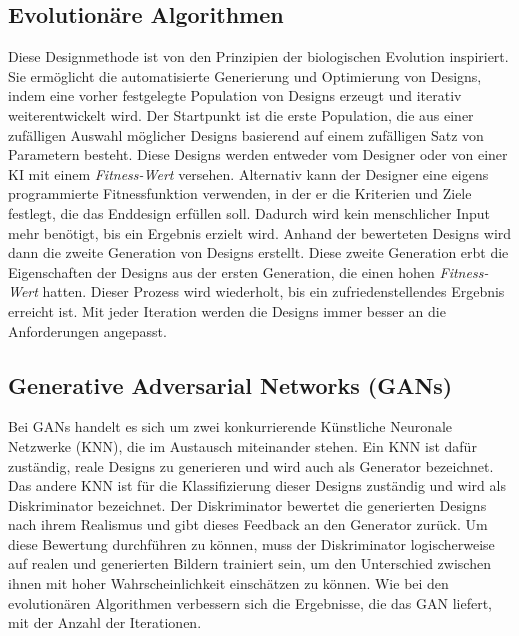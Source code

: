 \subsection*{Evolutionäre Algorithmen}
Diese Designmethode ist von den Prinzipien der biologischen Evolution inspiriert. Sie ermöglicht die automatisierte Generierung und Optimierung von Designs, indem eine vorher festgelegte Population von Designs erzeugt und iterativ weiterentwickelt wird.
Der Startpunkt ist die erste Population, die aus einer zufälligen Auswahl möglicher Designs basierend auf einem zufälligen Satz von Parametern besteht. Diese Designs werden entweder vom Designer oder von einer KI mit einem \textit{Fitness-Wert} versehen. Alternativ kann der Designer eine eigens programmierte Fitnessfunktion verwenden, in der er die Kriterien und Ziele festlegt, die das Enddesign erfüllen soll. Dadurch wird kein menschlicher Input mehr benötigt, bis ein Ergebnis erzielt wird. Anhand der bewerteten Designs wird dann die zweite Generation von Designs erstellt. Diese zweite Generation erbt die Eigenschaften der Designs aus der ersten Generation, die einen hohen \textit{Fitness-Wert} hatten. Dieser Prozess wird wiederholt, bis ein zufriedenstellendes Ergebnis erreicht ist. Mit jeder Iteration werden die Designs immer besser an die Anforderungen angepasst.\autocite{3}

\subsection*{Generative Adversarial Networks (GANs)}
Bei \ac*{GANs} handelt es sich um zwei konkurrierende Künstliche Neuronale Netzwerke (\ac*{KNN}), die im Austausch miteinander stehen. Ein \ac*{KNN} ist dafür zuständig, reale Designs zu generieren und wird auch als Generator bezeichnet. Das andere \ac*{KNN} ist für die Klassifizierung dieser Designs zuständig und wird als Diskriminator bezeichnet. Der Diskriminator bewertet die generierten Designs nach ihrem Realismus und gibt dieses Feedback an den Generator zurück. Um diese Bewertung durchführen zu können, muss der Diskriminator logischerweise auf realen und generierten Bildern trainiert sein, um den Unterschied zwischen ihnen mit hoher Wahrscheinlichkeit einschätzen zu können. Wie bei den evolutionären Algorithmen verbessern sich die Ergebnisse, die das \ac*{GAN} liefert, mit der Anzahl der Iterationen.\autocite{4}\autocite{11}
